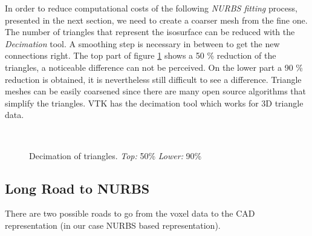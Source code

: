 In order to reduce computational costs of the following \textit{NURBS fitting} process, presented in the next section, we need to create a coarser mesh from the fine one. The number of triangles that represent the
isosurface can be reduced with the \textit{Decimation} tool. A smoothing step is necessary in between
to get the new connections right. The top part of figure \ref{fig:Decimation} shows a 50 \% reduction of the
triangles, a noticeable difference can not be perceived. On the lower part a 90 \% reduction is
obtained, it is nevertheless still difficult to see a difference. Triangle meshes can be easily
coarsened since there are many open source algorithms that simplify the triangles. VTK has the
decimation tool which works for 3D triangle data.

\begin{figure}
\centering
   \\
   \caption{Decimation of triangles. \textit{Top:} 50\% \textit{Lower:} 90\%}
   \label{fig:Decimation}
\end{figure}

\subsection{Long Road to NURBS}
There are two possible roads to go from the voxel data to the CAD representation (in our case NURBS based representation).
